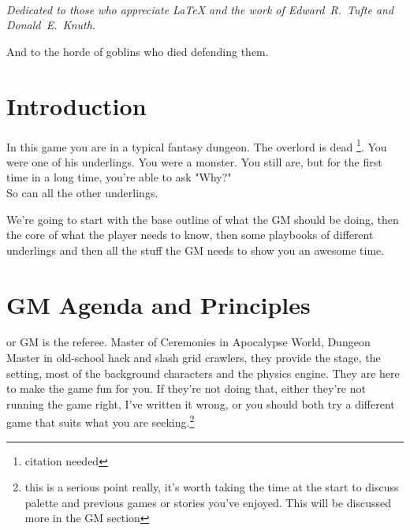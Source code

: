 \documentclass{tufte-book}
\begin{document}
\tableofcontents

\listoffigures

\listoftables

\cleardoublepage
~\vfill
\begin{doublespace}
\noindent\fontsize{18}{22}\selectfont\itshape
\nohyphenation
Dedicated to those who appreciate \LaTeX{} 
and the work of \mbox{Edward R.~Tufte} 
and \mbox{Donald E.~Knuth}.

And to the horde of goblins who died defending them.
\end{doublespace}
\vfill
\vfill


\cleardoublepage
\chapter*{Introduction}


In this game you are in a typical fantasy dungeon. The overlord is dead \footnote {citation needed}. You were one of his underlings. You were a monster. You still are, but for the first time in a long time, you're able to ask "Why?" \\
So can all the other underlings.

We're going to start with the base outline of what the GM should be doing, then the core of what the player needs to know, then some playbooks of different underlings and then all the stuff the GM needs to show you an awesome time.

\mainmatter


\chapter{GM Agenda and Principles}
\label{ch:agenda}


 or GM is the referee. Master of Ceremonies in Apocalypse World, Dungeon Master in old-school hack and slash grid crawlers, they provide the stage, the setting, most of the background characters and the physics engine. They are here to make the game fun for you. If they're not doing that, either they're not running the game right, I've written it wrong, or you should both try a different game that suits what you are seeking.\footnote{this is a serious point really, it's worth taking the time at the start to  discuss palette and previous games or stories you've enjoyed. This will be discussed more in the GM section}
\end{document}
